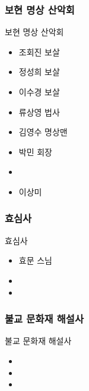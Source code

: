 \documentclass[aspectratio=1610,20pt,xcolor=pdftex,dvipsnames,table,handout]{beamer}
\begin{document}
		\begin{frame} [t,plain]
		\frametitle{보현 명상 산악회}

			\begin{block} {보현 명상 산악회}
			\setlength{\leftmargini}{2em}			
			\begin{itemize}
				\item 조회진 보살
				\item 정성희 보살
				\item 이수경 보살
				\item 류상영 법사
				\item 김영수 명상맨
				\item 박민 회장
				\item 
				\item 이상미
			\end{itemize}
			\end{block}						
		\end{frame}						

		\begin{frame} [t,plain]
		\frametitle{효심사}

			\begin{block} {효심사}
			\setlength{\leftmargini}{2em}			
			\begin{itemize}
				\item 효문 스님
				\item 
				\item 
			\end{itemize}
			\end{block}						
		\end{frame}						

		\begin{frame} [t,plain]
		\frametitle{불교 문화재 해설사}

			\begin{block} {불교 문화재 해설사}
			\setlength{\leftmargini}{2em}			
			\begin{itemize}
				\item 
				\item 
				\item 
			\end{itemize}
			\end{block}						
		\end{frame}						
\end{document}
